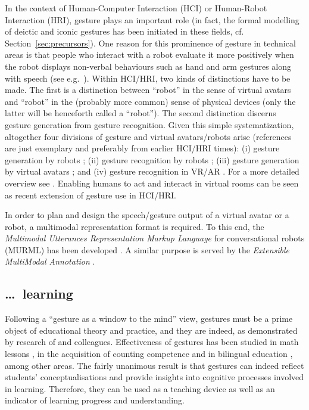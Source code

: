 \documentclass[output=paper]{langsci/langscibook}
\begin{document}
In the context of Human-Computer Interaction (HCI) or Human-Robot Interaction (HRI), gesture plays an important role (in fact, the formal modelling of deictic and iconic gestures has been initiated in these fields, cf. Section~\ref{sec:precursors}).
%
One reason for this prominence of gesture in technical areas is that people who interact with a robot evaluate it more positively when the robot displays non-verbal behaviours such as hand and arm gestures along with speech (see e.g.\ \citealt{Salem:et:al:2012}).
%
Within HCI/HRI, two kinds of distinctions have to be made. 
%
The first is a distinction between \enquote{robot} in the sense of virtual avatars and \enquote{robot} in the (probably more common) sense of physical devices (only the latter will be henceforth called a \enquote{robot}).
%
The second distinction discerns gesture generation from gesture recognition.
%
Given this simple systematization, altogether four divisions of gesture and virtual avatars/robots arise (references are just exemplary and preferably from earlier HCI/HRI times):
%
(i) gesture generation by robots \citep[e.g.][]{Le:et:al:2011};
%
(ii) gesture recognition by robots \citep[e.g.][]{Triesch:vanDerMalsburg:1998};
%
(iii) gesture generation by virtual avatars \citep[e.g.][]{Cassell:Stone:Yan:2000};
%
and (iv) gesture recognition in VR/AR \citep[e.g.][]{Weissmann:Salomon:1999}.
%
For a more detailed overview see \citet{Luecking:Pfeiffer:2012}.
%
Enabling humans to act and interact in virtual rooms \citep[e.g.][]{Pfeiffer:et:al:2018} can be seen as recent extension of gesture use in HCI/HRI.


In order to plan and design the speech/gesture output of a virtual avatar or a robot, a multimodal representation format is required.
%
To this end, the \textit{Multimodal Utterances Representation Markup Language} for conversational robots (MURML) has been developed \citep{Kranstedt:Kopp:Wachsmuth:2002:b}.
%
A similar purpose is served by the \textit{Extensible MultiModal Annotation} \citep[EMMA;][]{Johnston:2009}.





\subsection{\ldots\ learning}
\label{sec:learning}

Following a \enquote{gesture as a window to the mind} view, gestures must be a prime object of educational theory and practice, and they are indeed, as demonstrated by research of \citet{Cook:Goldin-Meadow:2006} and colleagues.
%
Effectiveness of gestures has been studied in math lessons \citep{Goldin-Meadow:Nusbaum:Kelly:Wagner:2001}, in the acquisition of counting competence \citep{Alibali:DiRusso:1999} and in bilingual education \citep{Breckinridge-Church:Ayman-Nolley:Mahootian:2004}, among other areas.
%
The fairly unanimous result is that gestures can indeed reflect students' conceptualisations and provide insights into cognitive processes involved in learning.
%
Therefore, they can be used as a teaching device as well as an indicator of learning progress and understanding. 
\end{document}
